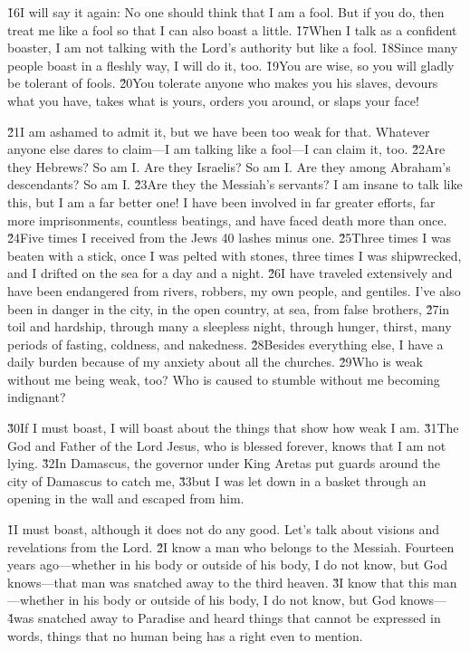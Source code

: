 \v{16}I will say it again: No one should think that I am a fool. But if you do, then treat me like a fool so that I can also boast a little. \v{17}When I talk as a confident boaster, I am not talking with the Lord's authority but like a fool. \v{18}Since many people boast in a fleshly way, I will do it, too. \v{19}You are wise, so you will gladly be tolerant of fools. \v{20}You tolerate anyone who makes you his slaves, devours what you have, takes what is yours, orders you around, or slaps your face!

\v{21}I am ashamed to admit it, but we have been too weak for that. Whatever anyone else dares to claim---I am talking like a fool---I can claim it, too. \v{22}Are they Hebrews? So am I. Are they Israelis? So am I. Are they among Abraham's descendants? So am I. \v{23}Are they the Messiah's servants? I am insane to talk like this, but I am a far better one! I have been involved in far greater efforts, far more imprisonments, countless beatings, and have faced death more than once. \v{24}Five times I received from the Jews 40 lashes minus one. \v{25}Three times I was beaten with a stick, once I was pelted with stones, three times I was shipwrecked, and I drifted on the sea for a day and a night. \v{26}I have traveled extensively and have been endangered from rivers, robbers, my own people, and gentiles. I've also been in danger in the city, in the open country, at sea, from false brothers, \v{27}in toil and hardship, through many a sleepless night, through hunger, thirst, many periods of fasting, coldness, and nakedness. \v{28}Besides everything else, I have a daily burden because of my anxiety about all the churches. \v{29}Who is weak without me being weak, too? Who is caused to stumble without me becoming indignant?

\v{30}If I must boast, I will boast about the things that show how weak I am. \v{31}The God and Father of the Lord Jesus, who is blessed forever, knows that I am not lying. \v{32}In Damascus, the governor under King Aretas put guards around the city of Damascus to catch me, \v{33}but I was let down in a basket through an opening in the wall and escaped from him.

\v{1}I must boast, although it does not do any good. Let's talk about visions and revelations from the Lord. \v{2}I know a man who belongs to the Messiah. Fourteen years ago---whether in his body or outside of his body, I do not know, but God knows---that man was snatched away to the third heaven. \v{3}I know that this man---whether in his body or outside of his body, I do not know, but God knows--- \v{4}was snatched away to Paradise and heard things that cannot be expressed in words, things that no human being has a right even to mention.

